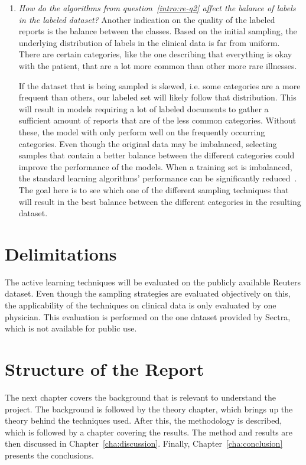 \begin{enumerate}
  \item \label{intro:re-q3}
      \textit{How do the algorithms from question~\ref{intro:re-q2} affect the balance of labels in the labeled dataset?}
      Another indication on the quality of the labeled reports is the balance between the classes.
      Based on the initial sampling, the underlying distribution of labels in the clinical data is far from uniform.
      There are certain categories, like the one describing that everything is okay with the patient, that are a lot more common than other more rare illnesses.

      If the dataset that is being sampled is skewed, i.e. some categories are a more frequent than others, our labeled set will likely follow that distribution.
      This will result in models requiring a lot of labeled documents to gather a sufficient amount of reports that are of the less common categories.
      Without these, the model with only perform well on the frequently occurring categories.
      Even though the original data may be imbalanced, selecting samples that contain a better balance between the different categories could improve the performance of the models.
      When a training set is imbalanced, the standard learning algorithms' performance can be significantly reduced~\cite{he2009learning}.
      The goal here is to see which one of the different sampling techniques that will result in the best balance between the different categories in the resulting dataset.

\end{enumerate}

\section{Delimitations}
\label{sec:delimitations}

The active learning techniques will be evaluated on the publicly available Reuters dataset.
Even though the sampling strategies are evaluated objectively on this, the applicability of the techniques on clinical data is only evaluated by one physician.
This evaluation is performed on the one dataset provided by Sectra, which is not available for public use.

\section{Structure of the Report}
\label{sec:structure}

The next chapter covers the background that is relevant to understand the project.
The background is followed by the theory chapter, which brings up the theory behind the techniques used.
After this, the methodology is described, which is followed by a chapter covering the results.
The method and results are then discussed in Chapter~\ref{cha:discussion}.
Finally, Chapter~\ref{cha:conclusion} presents the conclusions.
